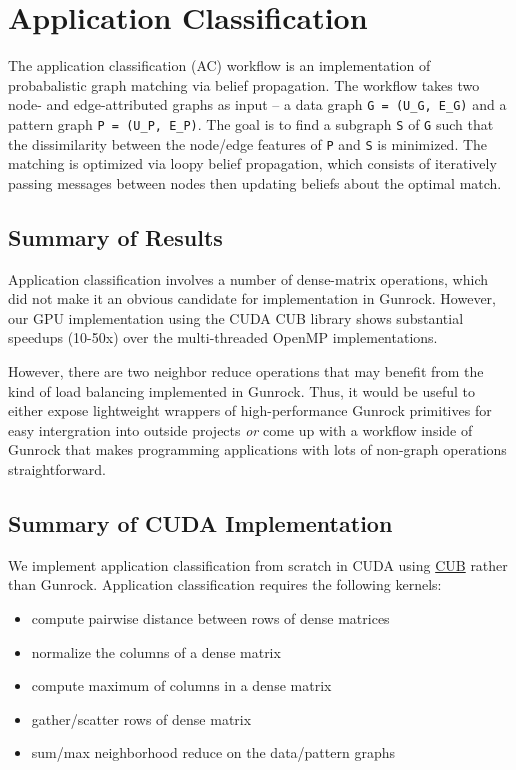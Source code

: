 \documentclass[10pt,oneside]{memoir}
\providecommand{\tightlist}{%
  \setlength{\itemsep}{0pt}\setlength{\parskip}{0pt}}
\begin{document}
\hypertarget{application-classification-1}{%
\chapter{Application
Classification}\label{application-classification-1}}

The application classification (AC) workflow is an implementation of
probabalistic graph matching via belief propagation. The workflow takes
two node- and edge-attributed graphs as input -- a data graph
\texttt{G\ =\ (U\_G,\ E\_G)} and a pattern graph
\texttt{P\ =\ (U\_P,\ E\_P)}. The goal is to find a subgraph \texttt{S}
of \texttt{G} such that the dissimilarity between the node/edge features
of \texttt{P} and \texttt{S} is minimized. The matching is optimized via
loopy belief propagation, which consists of iteratively passing messages
between nodes then updating beliefs about the optimal match.

\hypertarget{summary-of-results}{%
\section{Summary of Results}\label{summary-of-results}}

Application classification involves a number of dense-matrix operations,
which did not make it an obvious candidate for implementation in
Gunrock. However, our GPU implementation using the CUDA CUB library
shows substantial speedups (10-50x) over the multi-threaded OpenMP
implementations.

However, there are two neighbor reduce operations that may benefit from
the kind of load balancing implemented in Gunrock. Thus, it would be
useful to either expose lightweight wrappers of high-performance Gunrock
primitives for easy intergration into outside projects \emph{or} come up
with a workflow inside of Gunrock that makes programming applications
with lots of non-graph operations straightforward.

\hypertarget{summary-of-cuda-implementation}{%
\section{Summary of CUDA
Implementation}\label{summary-of-cuda-implementation}}

We implement application classification from scratch in CUDA using
\href{https://nvlabs.github.io/cub/}{CUB} rather than Gunrock.
Application classification requires the following kernels:

\begin{itemize}
\tightlist
\item
  compute pairwise distance between rows of dense matrices
\item
  normalize the columns of a dense matrix
\item
  compute maximum of columns in a dense matrix
\item
  gather/scatter rows of dense matrix
\item
  sum/max neighborhood reduce on the data/pattern graphs
\end{itemize}
\end{document}
